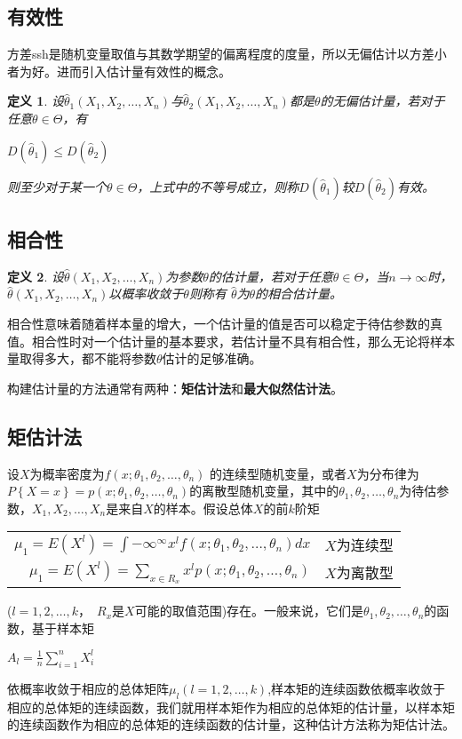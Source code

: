 \documentclass[11pt]{book}
\newtheorem{definition}{\hspace{2em}\textbf{定义}}
\begin{document}
\subsection{有效性}
方差ssh是随机变量取值与其数学期望的偏离程度的度量，所以无偏估计以方差小者为好。进而引入估计量有效性的概念。
\begin{definition}
	设$\hat{\theta}_1(X_1,X_2,\dots,X_n)$与$\hat{\theta}_2(X_1,X_2,\dots,X_n)$都是$\theta$的无偏估计量，若对于任意$\theta\in\Theta$，有
	\begin{center}
		$D(\hat{\theta}_1) \le D(\hat{\theta}_2)$
	\end{center}
	则至少对于某一个$\theta\in\Theta$，上式中的不等号成立，则称$D(\hat{\theta}_1)$较$D(\hat{\theta}_2)$有效。
\end{definition}
\subsection{相合性}
\begin{definition}
	设$\hat{\theta}(X_1,X_2,\dots,X_n)$为参数$\theta$的估计量，若对于任意$\theta\in\Theta$，当$n\to\infty$时，$\hat{\theta}(X_1,X_2,\dots,X_n)$以概率收敛于$\theta$则称有
	$\hat{\theta}$为$\theta$的相合估计量。
\end{definition}
相合性意味着随着样本量的增大，一个估计量的值是否可以稳定于待估参数的真值。相合性时对一个估计量的基本要求，若估计量不具有相合性，那么无论将样本量取得多大，都不能将参数$\theta$估计的足够准确。
	
	构建估计量的方法通常有两种：\textbf{矩估计法}和\textbf{最大似然估计法}。
	
	\subsection{矩估计法}
	设$X$为概率密度为$f(x;\theta_1,\theta_2,\dots,\theta_n)$ 的连续型随机变量，或者$X$为分布律为$P\left\lbrace X=x\right\rbrace =p(x;\theta_1,\theta_2,\dots,\theta_n)$的离散型随机变量，其中的$\theta_1,\theta_2,\dots,\theta_n$为待估参数，$X_1,X_2,\dots,X_n$是来自$X$的样本。假设总体$X$的前$k$阶矩
	\begin{center}
		\begin{tabular}{r l}
			$ \mu_1 = E(X^l) = \int{-\infty}^{\infty} x^l f(x;\theta_1,\theta_2,\dots,\theta_n) dx$ & $X$为连续型\\
			$ \mu_1 = E(X^l) = \sum\limits_{x \in R_x} x^l p(x;\theta_1,\theta_2,\dots,\theta_n)$  & $X$为离散型\\
		\end{tabular}
	\end{center}
	($l=1,2,\dots,k$，\ $R_x$是$X$可能的取值范围)存在。一般来说，它们是$\theta_1,\theta_2,\dots,\theta_n$的函数，基于样本矩
	\begin{center}
		$ A_l= \frac{1}{n}\sum\limits_{i=1}^n X_i^l $
	\end{center}
依概率收敛于相应的总体矩阵$\mu_l(l=1,2,\dots,k)$,样本矩的连续函数依概率收敛于相应的总体矩的连续函数，我们就用样本矩作为相应的总体矩的估计量，以样本矩的连续函数作为相应的总体矩的连续函数的估计量，这种估计方法称为矩估计法。
\end{document}
